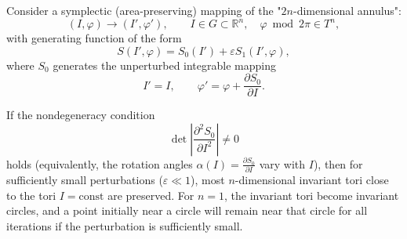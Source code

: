 Consider a symplectic (area-preserving) mapping of the "$2n$-dimensional annulus":
$$(I, \varphi) \to (I', \varphi'), \qquad I \in G \subset \mathbb{R}^n, \quad \varphi \bmod 2\pi \in T^n,$$
with generating function of the form
$$S(I', \varphi) = S_0(I') + \varepsilon S_1(I', \varphi),$$
where $S_0$ generates the unperturbed integrable mapping
$$I' = I, \qquad \varphi' = \varphi + \frac{\partial S_0}{\partial I}.$$

If the nondegeneracy condition
$$\det \left| \frac{\partial^2 S_0}{\partial I^2} \right| \neq 0$$
holds (equivalently, the rotation angles $\alpha(I) = \frac{\partial S_0}{\partial I}$ vary with $I$), then for sufficiently small perturbations ($\varepsilon \ll 1$), most $n$-dimensional invariant tori close to the tori $I = \text{const}$ are preserved. For $n = 1$, the invariant tori become invariant circles, and a point initially near a circle will remain near that circle for all iterations if the perturbation is sufficiently small.
